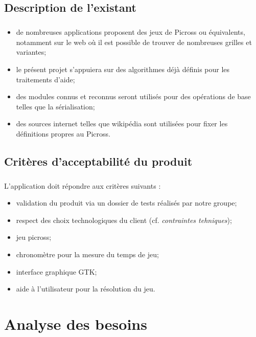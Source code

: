 \section{Description de l'existant}
\paragraph*{}
\begin{itemize}
\item de nombreuses applications proposent des jeux de Picross ou équivalents, notamment sur le web où il est possible de trouver de nombreuses grilles et variantes;
\item le présent projet s'appuiera sur des algorithmes déjà définis pour les traitements d'aide;
\item des modules connus et reconnus seront utilisés pour des opérations de base telles que la sérialisation;
\item des sources internet telles que wikipédia sont utilisées pour fixer les définitions propres au Picross.
\end{itemize}


\section{Critères d'acceptabilité du produit}
\paragraph*{}
L'application doit répondre aux critères suivants :
\begin{itemize}
\item validation du produit via un dossier de tests réalisés par notre groupe;
\item respect des choix technologiques du client (cf. \textit{contraintes tehniques});
\item jeu picross;
\item chronomètre pour la mesure du temps de jeu;
\item interface graphique GTK;
\item aide à l'utilisateur pour la résolution du jeu.
\end{itemize}




\chapter{Analyse des besoins} 


